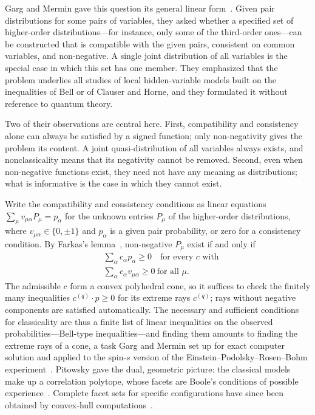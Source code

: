\documentclass[aps,pra,reprint,superscriptaddress,longbibliography,nofootinbib]{revtex4-2}
\begin{document}
Garg and Mermin gave this question its general linear form~\cite{Garg1984,Garg-Mermin-prl-84}.
Given pair distributions for some pairs of variables, they asked whether a specified set of higher-order distributions---for instance, only some of the third-order ones---can be constructed that is compatible with the given pairs, consistent on common variables, and non-negative.
A single joint distribution of all variables is the special case in which this set has one member.
They emphasized that the problem underlies all studies of local hidden-variable models built on the inequalities of Bell or of Clauser and Horne, and they formulated it without reference to quantum theory.

Two of their observations are central here.
First, compatibility and consistency alone can always be satisfied by a signed function; only non-negativity gives the problem its content.
A joint quasi-distribution of all variables always exists, and nonclassicality means that its negativity cannot be removed.
Second, even when non-negative functions exist, they need not have any meaning as distributions; what is informative is the case in which they cannot exist.

Write the compatibility and consistency conditions as linear equations $\sum_\mu v_{\mu\alpha}P_\mu = p_\alpha$ for the unknown entries $P_\mu$ of the higher-order distributions, where $v_{\mu\alpha}\in\{0,\pm 1\}$ and $p_\alpha$ is a given pair probability, or zero for a consistency condition.
By Farkas's lemma~\cite{Farkas1902}, non-negative $P_\mu$ exist if and only if
\begin{equation}
\begin{aligned}
&\textstyle\sum_\alpha c_\alpha p_\alpha \ge 0
\quad\text{for every } c \text{ with} \\
&\textstyle\sum_\alpha c_\alpha v_{\mu\alpha}\ge 0 \ \text{for all } \mu .
\end{aligned}
\label{eq:Farkas}
\end{equation}
The admissible $c$ form a convex polyhedral cone, so it suffices to check the finitely many inequalities $c^{(q)}\cdot p\ge 0$ for its extreme rays $c^{(q)}$; rays without negative components are satisfied automatically.
The necessary and sufficient conditions for classicality are thus a finite list of linear inequalities on the observed probabilities---Bell-type inequalities---and finding them amounts to finding the extreme rays of a cone, a task Garg and Mermin set up for exact computer solution and applied to the spin-$s$ version of the Einstein--Podolsky--Rosen--Bohm experiment~\cite{Garg1984}.
Pitowsky gave the dual, geometric picture: the classical models make up a correlation polytope, whose facets are Boole's conditions of possible experience~\cite{pitowsky-86,pitowsky,Pit-91,Pit-94}.
Complete facet sets for specific configurations have since been obtained by convex-hull computations~\cite{2000-poly}.
\end{document}
